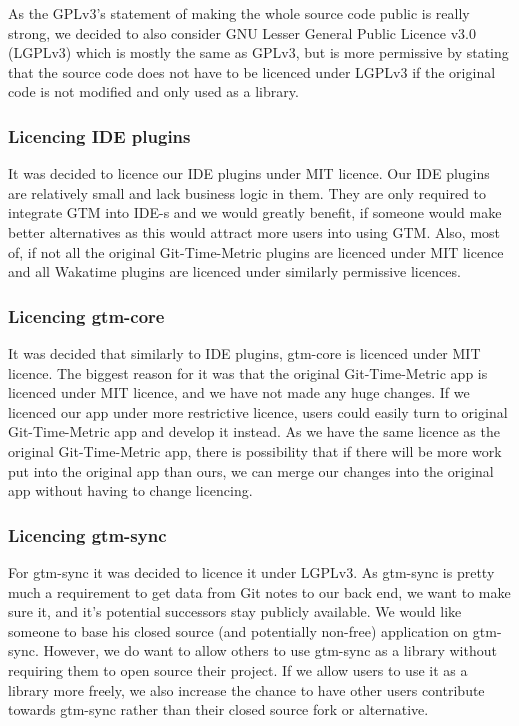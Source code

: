 As the GPLv3's statement of making the whole source code public is really strong, we decided to also consider
GNU Lesser General Public Licence v3.0 (LGPLv3) which is mostly the same as GPLv3, but is more permissive by
stating that the source code does not have to be licenced under LGPLv3 if the original code is not modified and only used as a library.
\cite{lgplv3-licence}

\subsubsection{Licencing IDE plugins}\label{subsubsec:licencing-ide-plugins}
It was decided to licence our IDE plugins under MIT licence.
Our IDE plugins are relatively small and lack business logic in them.
They are only required to integrate GTM into IDE-s and we would greatly benefit, if someone would make better alternatives
as this would attract more users into using GTM.
Also, most of, if not all the original Git-Time-Metric plugins are licenced under MIT licence and all Wakatime plugins are
licenced under similarly permissive licences.

\subsubsection{Licencing gtm-core}\label{subsubsec:licencing-gtm-core}
It was decided that similarly to IDE plugins, gtm-core is licenced under MIT licence.
The biggest reason for it was that the original Git-Time-Metric app is licenced under MIT licence, and we have not made any huge changes.
If we licenced our app under more restrictive licence, users could easily turn to original Git-Time-Metric app and develop it instead.
As we have the same licence as the original Git-Time-Metric app, there is possibility that if there will be more work put into the
original app than ours, we can merge our changes into the original app without having to change licencing.

\subsubsection{Licencing gtm-sync}\label{subsubsec:licencing-gtm-sync}
For gtm-sync it was decided to licence it under LGPLv3.
As gtm-sync is pretty much a requirement to get data from Git notes to our back end, we want to make sure it,
and it's potential successors stay publicly available.
We would like someone to base his closed source (and potentially non-free) application on gtm-sync.
However, we do want to allow others to use gtm-sync as a library without requiring them to open source their project.
If we allow users to use it as a library more freely, we also increase the chance to have other users contribute towards gtm-sync
rather than their closed source fork or alternative.

